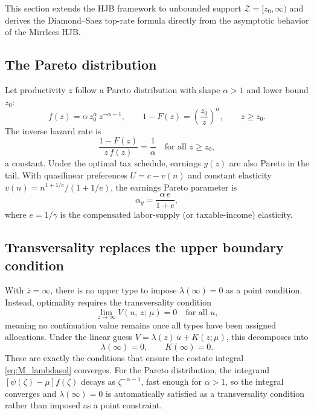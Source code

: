 \documentclass[12pt]{article}
\newcommand{\calZ}{\mathcal{Z}}
\newcommand{\zbar}{\bar{z}}
\newcommand{\zlow}{z_{0}}
\begin{document}
This section extends the HJB framework to unbounded support
$\calZ = [\zlow, \infty)$ and derives the Diamond--Saez top-rate formula
directly from the asymptotic behavior of the Mirrlees HJB.

\subsection{The Pareto distribution}

Let productivity $z$ follow a Pareto distribution with shape $\alpha > 1$
and lower bound $\zlow$:
\begin{equation}\label{eq:pareto_f}
  f(z) = \alpha\,\zlow^\alpha\, z^{-\alpha-1}, \qquad
  1 - F(z) = \left(\frac{\zlow}{z}\right)^\alpha, \qquad z \ge \zlow.
\end{equation}
The inverse hazard rate is
\begin{equation}\label{eq:pareto_haz}
  \frac{1-F(z)}{z\,f(z)} = \frac{1}{\alpha}\quad \text{for all } z \ge \zlow,
\end{equation}
a constant.  Under the optimal tax schedule, earnings $y(z)$ are also Pareto
in the tail.  With quasilinear preferences $U = c - v(n)$ and constant
elasticity $v(n) = n^{1+1/e}/(1+1/e)$, the earnings Pareto parameter is
\begin{equation}\label{eq:pareto_y}
  \alpha_y = \frac{\alpha\, e}{1+e},
\end{equation}
where $e = 1/\gamma$ is the compensated labor-supply (or taxable-income)
elasticity.

\subsection{Transversality replaces the upper boundary condition}

With $\zbar = \infty$, there is no upper type to impose $\lambda(\infty) = 0$
as a point condition.  Instead, optimality requires the transversality
condition
\begin{equation}\label{eq:pareto_TV}
  \lim_{z\to\infty} V(u,\, z;\, \mu) = 0 \quad \text{for all } u,
\end{equation}
meaning no continuation value remains once all types have been assigned
allocations.  Under the linear guess $V = \lambda(z)\,u + K(z;\mu)$, this
decomposes into
\begin{equation}\label{eq:pareto_BC}
  \lambda(\infty) = 0, \qquad K(\infty) = 0.
\end{equation}
These are exactly the conditions that ensure the costate integral
\eqref{eq:M_lambdasol} converges.  For the Pareto distribution, the integrand
$[\psi(\zeta)-\mu]f(\zeta)$ decays as $\zeta^{-\alpha-1}$, fast enough for
$\alpha > 1$, so the integral converges and $\lambda(\infty) = 0$ is
automatically satisfied as a transversality condition rather than imposed as
a point constraint.
\end{document}
